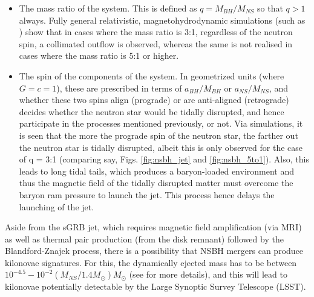     \begin{itemize}

        \item The mass ratio of the system. This is defined as $q = M_{BH} / M_{NS}$ so
            that $q > 1$ always. Fully general relativistic, magnetohydrodynamic
            simulations (such as \cite{ruiz_2020}) show that in cases where the  mass
            ratio is 3:1, regardless of the neutron spin, a collimated outflow is
            observed, whereas the same is not realised in cases where the mass ratio is
            5:1 or higher.
        \item The spin of the components of the system. In geometrized units (where $G =
            c = 1$), these are prescribed in terms of $a_{BH} / M_{BH}$ or $a_{NS} /
            M_{NS}$, and whether these two spins align (prograde) or are anti-aligned
            (retrograde) decides whether the neutron star would be tidally disrupted,
            and hence participate in the processes mentioned previously, or not. Via
            simulations, it is seen that the more the prograde spin of the neutron star,
            the farther out the neutron star is tidally disrupted, albeit this is only
            observed for the case of q = 3:1 (comparing say, Figs. \ref{fig:nsbh_jet}
            and \ref{fig:nsbh_5to1}). Also, this leads to long tidal tails, which
            produces a baryon-loaded environment and thus the magnetic field of the
            tidally disrupted matter must overcome the baryon ram pressure to launch the
            jet. This process hence delays the launching of the jet.
    \end{itemize}

    Aside from the sGRB jet, which requires magnetic field amplification (via MRI) as
    well as thermal pair production (from the disk remnant) followed by the
    Blandford-Znajek process, there is a possibility that NSBH mergers can produce
    kilonovae signatures. For this, the dynamically ejected mass has to be between
    $10^{-4.5} - 10^{-2} (M_{NS}/1.4 M_{\odot}) M_{\odot}$ (see \cite{ruiz_2020} for
    more details), and this will lead to kilonovae potentially detectable by the Large
    Synoptic Survey Telescope (LSST).

